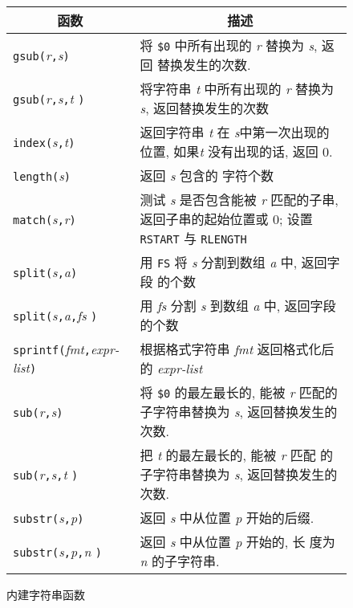 \begin{figure}[ht]
    \captionsetup{type=table}
    \caption{内建字符串函数}
    \label{tbl:built_in_string_functions}
    \begin{center}
        \begin{tabular}{l|p{25em}}
            \hline
            \hline
            \multicolumn{1}{c}{函数}    & \multicolumn{1}{c}{描述}  \\
            \hline
            \verb'gsub('\textit{r}\verb','\textit{s}\verb')' &  将
            \verb'$0' 中所有出现的 \textit{r} 替换为 \textit{s}, 返回
            替换发生的次数. \\
            \verb'gsub('\textit{r}\verb','\textit{s}\verb','\textit{t}
            \verb')'    & 将字符串 \textit{t} 中所有出现的 \textit{r}
            替换为 \textit{s}, 返回替换发生的次数 \\
            \verb'index('\textit{s}\verb','\textit{t}\verb')' & 返回字符串
            \textit{t} 在 \textit{s}中第一次出现的位置, 如果\textit{t}
            没有出现的话, 返回 0.   \\
            \verb'length('\textit{s}\verb')'    & 返回 \textit{s} 包含的
            字符个数 \\
            \verb'match('\textit{s}\verb','\textit{r}\verb')'   &
            测试 \textit{s} 是否包含能被 \textit{r} 匹配的子串,
            返回子串的起始位置或
            0; 设置 \verb'RSTART' 与 \verb'RLENGTH' \\
            \verb'split('\textit{s}\verb','\textit{a}\verb')'   &
            用 \verb'FS' 将 \textit{s} 分割到数组 \textit{a} 中, 返回字段
            的个数  \\
            \verb'split('\textit{s}\verb','\textit{a}\verb','\textit{fs}%
            \verb')'    & 用 \textit{fs} 分割 \textit{s} 到数组 \textit{a}
            中, 返回字段的个数  \\
            \verb'sprintf('\textit{fmt}\verb','\textit{expr-list}\verb')'
            & 根据格式字符串 \textit{fmt} 返回格式化后的 \textit{expr-list}
            \\
            \verb'sub('\textit{r}\verb','\textit{s}\verb')' &
            将 \verb'$0' 的最左最长的, 能被 \textit{r} 匹配的子字符串替换为
            \textit{s}, 返回替换发生的次数. \\
            \verb'sub('\textit{r}\verb','\textit{s}\verb','\textit{t}%
            \verb')'    & 把 \textit{t} 的最左最长的, 能被 \textit{r} 匹配
            的子字符串替换为 \textit{s}, 返回替换发生的次数.    \\
            \verb'substr('\textit{s}\verb','\textit{p}\verb')'  &
            返回 \textit{s} 中从位置 \textit{p} 开始的后缀.\\
            \verb'substr('\textit{s}\verb','\textit{p}\verb','\textit{n}%
            \verb')'    & 返回 \textit{s} 中从位置 \textit{p} 开始的, 长
            度为 \textit{n} 的子字符串. \\
            \hline
        \end{tabular}
    \end{center}
\end{figure}

